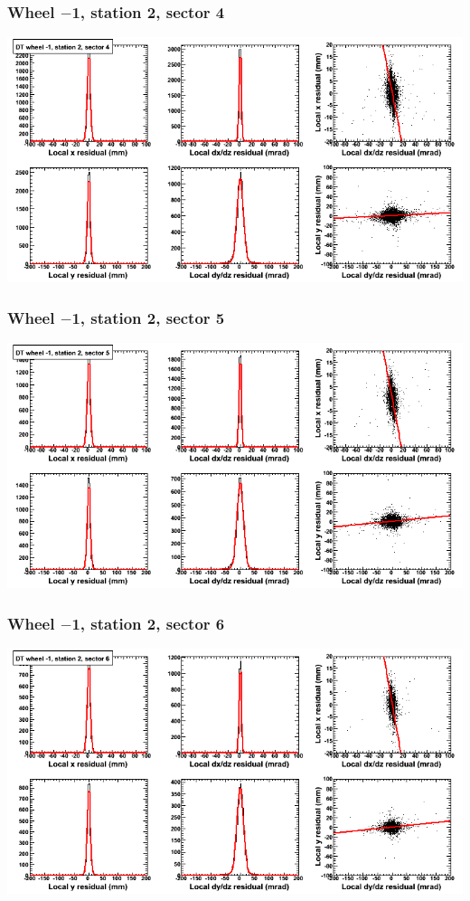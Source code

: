 \documentclass[compress]{beamer}
\begin{document}
\begin{frame}
\frametitle{Wheel $-$1, station 2, sector 4}
\includegraphics[width=\linewidth]{tmpbell_MBwhBst2sec04.png}
\end{frame}

\begin{frame}
\frametitle{Wheel $-$1, station 2, sector 5}
\includegraphics[width=\linewidth]{tmpbell_MBwhBst2sec05.png}
\end{frame}

\begin{frame}
\frametitle{Wheel $-$1, station 2, sector 6}
\includegraphics[width=\linewidth]{tmpbell_MBwhBst2sec06.png}
\end{frame}
\end{document}
